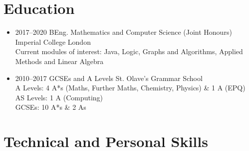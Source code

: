 \documentclass{moderncv}        %
\begin{document}
\maketitle

\vspace{-30pt}

\section{Education}

\vspace{5pt}

\begin{itemize}

\item{
\cventry
{2017--2020}
{BEng. Mathematics and Computer Science (Joint Honours)}
{Imperial College London}
{}{}{
\noindent
\\
Current modules of interest: Java, Logic, Graphs and Algorithms, Applied Methods and Linear Algebra
}
} %

\item{
\cventry
{2010--2017}
{GCSEs and A Levels}
{St. Olave's Grammar School}
{}{}{
\noindent
\\
A Levels: 4 A*s (Maths, Further Maths, Chemistry, Physics) \& 1 A (EPQ)
\\
AS Levels: 1 A (Computing)
\\
GCSEs: 10 A*s \& 2 As
}}

\end{itemize}

\section{Technical and Personal Skills}
\end{document}
